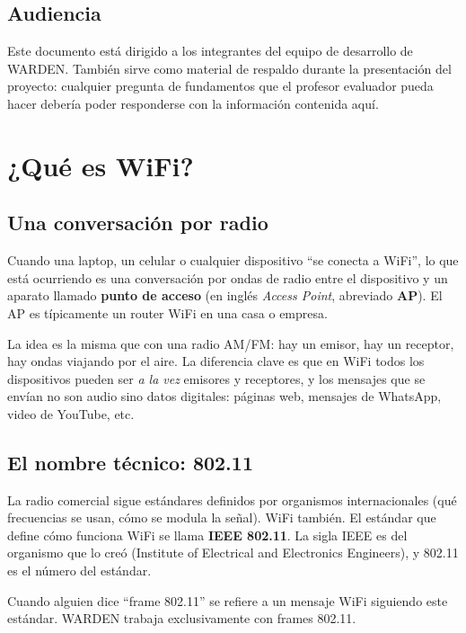 \documentclass[11pt,a4paper]{article}
\begin{document}
\subsection{Audiencia}
Este documento está dirigido a los integrantes del equipo de desarrollo de
WARDEN. También sirve como material de respaldo durante la presentación
del proyecto: cualquier pregunta de fundamentos que el profesor evaluador
pueda hacer debería poder responderse con la información contenida aquí.

\section{¿Qué es WiFi?}

\subsection{Una conversación por radio}
Cuando una laptop, un celular o cualquier dispositivo ``se conecta a WiFi'',
lo que está ocurriendo es una conversación por ondas de radio entre el
dispositivo y un aparato llamado \textbf{punto de acceso} (en inglés
\emph{Access Point}, abreviado \textbf{AP}). El AP es típicamente un router
WiFi en una casa o empresa.

La idea es la misma que con una radio AM/FM: hay un emisor, hay un receptor,
hay ondas viajando por el aire. La diferencia clave es que en WiFi todos
los dispositivos pueden ser \emph{a la vez} emisores y receptores, y los
mensajes que se envían no son audio sino datos digitales: páginas web,
mensajes de WhatsApp, video de YouTube, etc.

\subsection{El nombre técnico: 802.11}
La radio comercial sigue estándares definidos por organismos internacionales
(qué frecuencias se usan, cómo se modula la señal). WiFi también. El estándar
que define cómo funciona WiFi se llama \textbf{IEEE 802.11}. La sigla IEEE es
del organismo que lo creó (Institute of Electrical and Electronics
Engineers), y 802.11 es el número del estándar.

Cuando alguien dice ``frame 802.11'' se refiere a un mensaje WiFi siguiendo
este estándar. WARDEN trabaja exclusivamente con frames 802.11.
\end{document}
